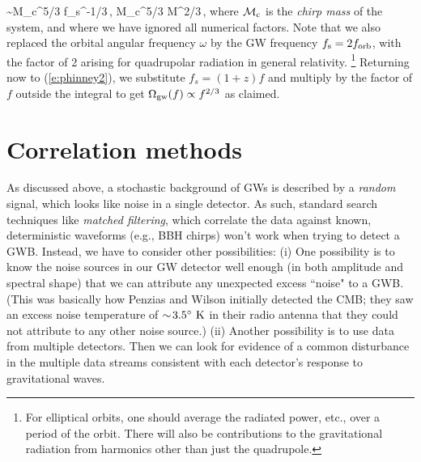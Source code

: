\sim {\cal M}_{\rm c}^{5/3} f_{\rm s}^{-1/3}\,,
\qquad
{\cal M}_c^{5/3} \equiv M^{2/3}\mu\,,
\ee
%
where ${\cal M}_{\rm c}$ is the {\em chirp mass} of 
the system, and where we have ignored all numerical
factors.
Note that we also replaced the orbital angular frequency
$\omega$ by the GW frequency
$f_{\rm s} = 2 f_{\rm orb}$, with the factor of 2 
arising for quadrupolar radiation in general relativity.%
\footnote{For elliptical orbits, one should average
the radiated power, etc., over a period of the orbit.
There will also be contributions to the gravitational
radiation from harmonics other than just the quadrupole.} 
Returning now to (\ref{e:phinney2}), we substitute
$f_s=(1+z)f$ and multiply by the factor of $f$ outside 
the integral to get
$\Omega_{\rm gw}(f) \propto f^{2/3}$ as claimed.

\section{Correlation methods}
\label{s:correlations}

As discussed above, a stochastic background of GWs 
is described by a {\em random} signal, which looks 
like noise in a single detector.
As such, standard search techniques like 
{\em matched filtering}, which correlate the data 
against known, deterministic waveforms (e.g., BBH chirps) 
won't work when trying to detect a GWB.
Instead, we have to consider other possibilities:
(i) One possibility is to know the noise sources 
in our GW detector well enough (in both 
amplitude and spectral shape) that we can 
attribute any unexpected excess ``noise" to a GWB.
(This was basically how Penzias and Wilson 
initially detected the CMB; they saw an excess 
noise temperature of $\sim\!3.5^\circ~{\rm K}$ in their
radio antenna that they could not attribute to 
any other noise source.)
(ii) Another possibility is to use data from 
multiple detectors.
Then we can look for evidence of a common 
disturbance in the multiple data streams 
consistent with each detector's response to 
gravitational waves.

